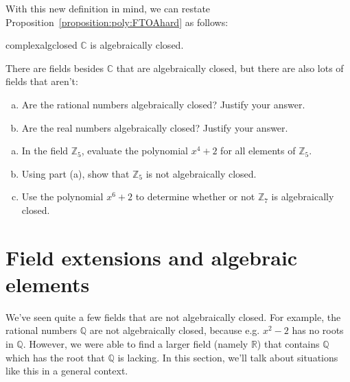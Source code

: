 With this new definition in mind, we can restate Proposition~\ref{proposition:poly:FTOAhard} as follows: 

\begin{prop}{complexalgclosed}
$\mathbb{C}$ is algebraically closed.
\end{prop}

There are fields  besides $\mathbb{C}$ that are algebraically closed,  but there are  also  lots of fields that aren't:

\begin{exercise}{}
\begin {enumerate}[(a)]
\item
Are the rational numbers algebraically closed? Justify your answer.
\item
Are the real numbers algebraically closed? Justify your answer.
\end{enumerate}
\end{exercise}


\begin{exercise}{}
\begin{enumerate}[(a)]
\item
In the field $\mathbb{Z}_5$, evaluate the polynomial $x^4+2$  for all elements of  $\mathbb{Z}_5$.
\item
Using part (a), show  that $\mathbb{Z}_5$ is not algebraically closed.
\item
Use the polynomial $x^6 + 2$ to determine whether or not $\mathbb{Z}_7$ is algebraically closed.
\end{enumerate}
\end{exercise}

\section{Field extensions and algebraic elements}
We've seen quite a few fields that are not algebraically closed. For example, the rational numbers $\mathbb{Q}$ are not algebraically closed, because e.g. $x^2 - 2$ has no  roots in $\mathbb{Q}$.  However, we were able to find a larger field (namely $\mathbb{R}$) that contains $\mathbb{Q}$ which has the root that $\mathbb{Q}$ is lacking. In this section, we'll talk about situations like this in a general context. 


